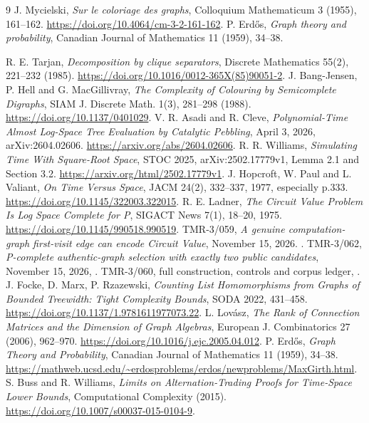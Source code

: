 \documentclass[11pt]{article}
\begin{document}
\begin{thebibliography}{9}
 J. Mycielski,
\emph{Sur le coloriage des graphs}, Colloquium Mathematicum
3 (1955), 161--162.
\url{https://doi.org/10.4064/cm-3-2-161-162}.
 P. Erd\H{o}s,
\emph{Graph theory and probability}, Canadian Journal of
Mathematics 11 (1959), 34--38.

 R. E. Tarjan,
\emph{Decomposition by clique separators}, Discrete Mathematics
55(2), 221--232 (1985).
\url{https://doi.org/10.1016/0012-365X(85)90051-2}.
J. Bang-Jensen, P. Hell and G. MacGillivray,
\emph{The Complexity of Colouring by Semicomplete Digraphs},
SIAM J. Discrete Math. 1(3), 281--298 (1988).
\url{https://doi.org/10.1137/0401029}.
V. R. Asadi and R. Cleve,
\emph{Polynomial-Time Almost Log-Space Tree Evaluation by
Catalytic Pebbling}, April 3, 2026, arXiv:2604.02606.
\url{https://arxiv.org/abs/2604.02606}.
 R. R. Williams, \emph{Simulating Time With
Square-Root Space}, STOC 2025, arXiv:2502.17779v1, Lemma 2.1 and
Section 3.2. \url{https://arxiv.org/html/2502.17779v1}.
 J. Hopcroft, W. Paul and L. Valiant,
\emph{On Time Versus Space}, JACM 24(2), 332--337, 1977,
especially p.333. \url{https://doi.org/10.1145/322003.322015}.
 R. E. Ladner, \emph{The Circuit Value Problem
Is Log Space Complete for P}, SIGACT News 7(1), 18--20, 1975.
\url{https://doi.org/10.1145/990518.990519}.
 TMR-3/059, \emph{A genuine computation-graph
first-visit edge can encode Circuit Value}, November 15, 2026.
.
 TMR-3/062,
\emph{P-complete authentic-graph selection with exactly two public
candidates}, November 15, 2026,
.
 TMR-3/060, full construction, controls and corpus ledger,
.
J. Focke, D. Marx, P. Rzazewski,
\emph{Counting List Homomorphisms from Graphs of Bounded Treewidth:
Tight Complexity Bounds}, SODA 2022, 431--458.
\url{https://doi.org/10.1137/1.9781611977073.22}.
L. Lov\'asz, \emph{The Rank of Connection Matrices and the Dimension
of Graph Algebras}, European J. Combinatorics 27 (2006), 962--970.
\url{https://doi.org/10.1016/j.ejc.2005.04.012}.
P. Erd\H{o}s, \emph{Graph Theory and Probability},
Canadian Journal of Mathematics 11 (1959), 34--38.
\url{https://mathweb.ucsd.edu/~erdosproblems/erdos/newproblems/MaxGirth.html}.
S. Buss and R. Williams,
\emph{Limits on Alternation-Trading Proofs for Time-Space Lower Bounds},
Computational Complexity (2015).
\url{https://doi.org/10.1007/s00037-015-0104-9}.
\end{thebibliography}
\end{document}
